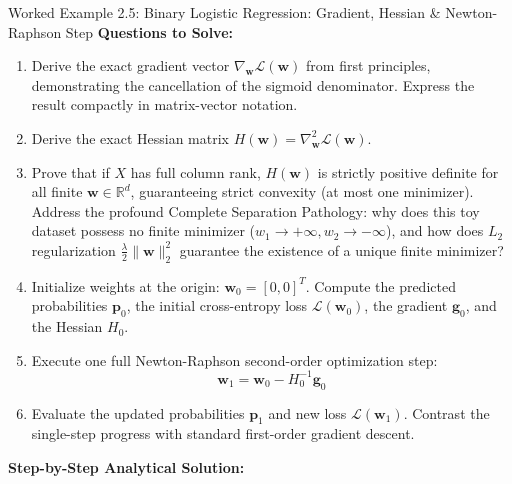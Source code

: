 \begin{examplebox}[breakable]{Worked Example 2.5: Binary Logistic Regression: Gradient, Hessian \& Newton-Raphson Step}
\textbf{Questions to Solve:}
\begin{enumerate}
    \item Derive the exact gradient vector $\nabla_{\mathbf{w}} \mathcal{L}(\mathbf{w})$ from first principles, demonstrating the cancellation of the sigmoid denominator. Express the result compactly in matrix-vector notation.
    \item Derive the exact Hessian matrix $H(\mathbf{w}) = \nabla^2_{\mathbf{w}} \mathcal{L}(\mathbf{w})$.
    \item Prove that if $X$ has full column rank, $H(\mathbf{w})$ is strictly positive definite for all finite $\mathbf{w} \in \mathbb{R}^d$, guaranteeing strict convexity (at most one minimizer). Address the profound Complete Separation Pathology: why does this toy dataset possess no finite minimizer ($w_1 \to +\infty, w_2 \to -\infty$), and how does $L_2$ regularization $\frac{\lambda}{2}\|\mathbf{w}\|_2^2$ guarantee the existence of a unique finite minimizer?
    \item Initialize weights at the origin: $\mathbf{w}_0 = [0, 0]^T$. Compute the predicted probabilities $\mathbf{p}_0$, the initial cross-entropy loss $\mathcal{L}(\mathbf{w}_0)$, the gradient $\mathbf{g}_0$, and the Hessian $H_0$.
    \item Execute one full Newton-Raphson second-order optimization step:
    \begin{equation*}
    \mathbf{w}_1 = \mathbf{w}_0 - H_0^{-1} \mathbf{g}_0
    \end{equation*}
    \item Evaluate the updated probabilities $\mathbf{p}_1$ and new loss $\mathcal{L}(\mathbf{w}_1)$. Contrast the single-step progress with standard first-order gradient descent.
\end{enumerate}

\tcblower
\textbf{Step-by-Step Analytical Solution:}


\end{examplebox}
